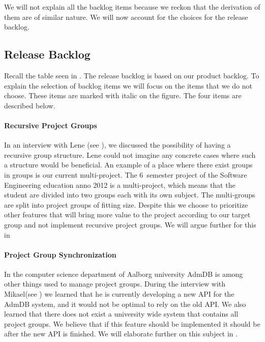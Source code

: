 We will not explain all the backlog items because we reckon that the derivation of them are of similar nature.
We will now account for the choices for the release backlog.

\subsection{Release Backlog}
\label{sec:releaseBacklog}
Recall the table seen in . 
The release backlog is based on our product backlog.
To explain the selection of backlog items we will focus on the items that we do not choose.
These items are marked with italic on the figure.
The four items are described below.

\paragraph{Recursive Project Groups}
In an interview with Lene (see ), we discussed the possibility of having a recursive group structure.
Lene could not imagine any concrete cases where such a structure would be beneficial. 
An example of a place where there exist groups in groups is our current multi-project.
The 6\ths~semester project of the Software Engineering education anno 2012 is a multi-project, which means that the student are divided into two groups each with its own subject. 
The multi-groups are split into project groups of fitting size.
Despite this we choose to prioritize other features that will bring more value to the project according to our target group and not implement recursive project groups.
We will argue further for this in \secref{} 

\paragraph{Project Group Synchronization}
In the computer science department of Aalborg university AdmDB is among other things used to manage project groups. 
During the interview with Mikael(see ) we learned that he is currently developing a new API for the AdmDB system, and it would not be optimal to rely on the old API. 
We also learned that there does not exist a university wide system that contains all project groups. 
We believe that if this feature should be implemented it should be after the new API is finished.
We will elaborate further on this subject in . 

